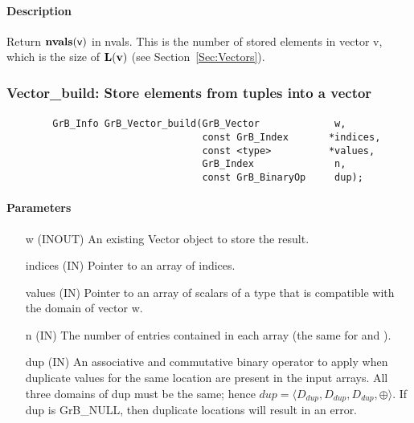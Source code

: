 \paragraph{Description}


Return $\mathbf{nvals}({\sf v})$ in {\sf nvals}. This is the number of stored 
elements in vector {\sf v}, which is the size of $\mathbf{L}({\bf v})$ (see 
Section~\ref{Sec:Vectors}).


\subsubsection{{\sf Vector\_build}: Store elements from tuples into a vector }
\label{Sec:Vector_build}

\paragraph{\syntax}

\begin{verbatim}
        GrB_Info GrB_Vector_build(GrB_Vector             w,
                                  const GrB_Index       *indices,
                                  const <type>          *values,
                                  GrB_Index              n,
                                  const GrB_BinaryOp     dup);
\end{verbatim}

\paragraph{Parameters}

\begin{itemize}[leftmargin=1.1in]
    \item[{\sf w}]       ({\sf INOUT}) An existing Vector object to store the result.
    \item[{\sf indices}] ({\sf IN}) Pointer to an array of indices. 
    \item[{\sf values}]  ({\sf IN}) Pointer to an array of scalars of a type that
                                     is compatible with the domain of vector {\sf w}.
    \item[{\sf n}]       ({\sf IN}) The number of entries contained in each array (the same for  and ).
    \item[{\sf dup}]     ({\sf IN}) An associative and commutative binary operator 
    to apply when duplicate values for the same location are present in the input
    arrays. All three domains of {\sf dup} must be the same; hence
	    $dup=\langle D_{dup},D_{dup},D_{dup},\oplus \rangle$.
    If {\sf dup} is {\sf GrB\_NULL}, then duplicate locations will result in an error.  
\end{itemize}


